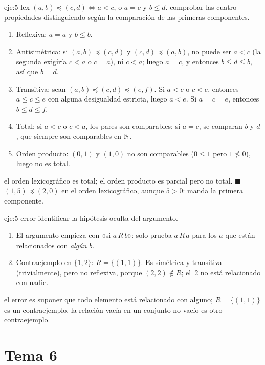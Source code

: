 \begin{solucion}{eje:5-lex}
\datos $(a,b)\preceq(c,d)\iff a<c$, o $a=c$ y $b\le d$.
\planteamiento comprobar las cuatro propiedades distinguiendo según la comparación de las primeras componentes.
\pasos
\begin{enumerate}[label=\arabic*.]
  \item Reflexiva: $a=a$ y $b\le b$.
  \item Antisimétrica: si $(a,b)\preceq(c,d)$ y $(c,d)\preceq(a,b)$, no puede ser $a<c$ (la segunda exigiría $c<a$ o $c=a$), ni $c<a$; luego $a=c$, y entonces $b\le d\le b$, así que $b=d$.
  \item Transitiva: sean $(a,b)\preceq(c,d)\preceq(e,f)$. Si $a<c$ o $c<e$, entonces $a\le c\le e$ con alguna desigualdad estricta, luego $a<e$. Si $a=c=e$, entonces $b\le d\le f$.
  \item Total: si $a<c$ o $c<a$, los pares son comparables; si $a=c$, se comparan $b$ y $d$, que siempre son comparables en $\mathbb{N}$.
  \item Orden producto: $(0,1)$ y $(1,0)$ no son comparables ($0\le1$ pero $1\not\le0$), luego no es total.
\end{enumerate}
\resultado el orden lexicográfico es total; el orden producto es parcial pero no total. \hfill$\blacksquare$
\comprobacion $(1,5)\preceq(2,0)$ en el orden lexicográfico, aunque $5>0$: manda la primera componente.
\end{solucion}

\begin{solucion}{eje:5-error}
\planteamiento identificar la hipótesis oculta del argumento.
\pasos
\begin{enumerate}[label=\arabic*.]
  \item El argumento empieza con «si $a\,R\,b$»: solo prueba $a\,R\,a$ para los $a$ que están relacionados con \emph{algún} $b$.
  \item Contraejemplo en $\{1,2\}$: $R=\{(1,1)\}$. Es simétrica y transitiva (trivialmente), pero no reflexiva, porque $(2,2)\notin R$; el~2 no está relacionado con nadie.
\end{enumerate}
\resultado el error es suponer que todo elemento está relacionado con alguno; $R=\{(1,1)\}$ es un contraejemplo.
\comprobacion la relación vacía en un conjunto no vacío es otro contraejemplo.
\end{solucion}

\section{Tema 6}

